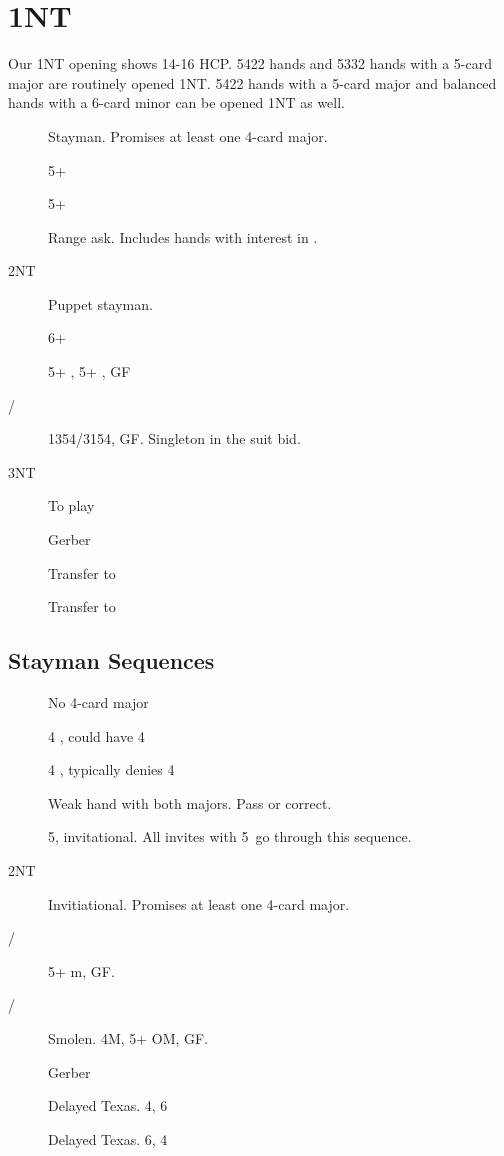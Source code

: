 \documentclass[tom-ari]{subfiles}
\begin{document}
\chapter{1NT}

Our 1NT opening shows 14-16 HCP. 5422 hands and 5332 hands with a 5-card major are routinely opened 1NT.
5422 hands with a 5-card major and balanced hands with a 6-card minor can be opened 1NT as well.

\begin{description}
  \item[] Stayman. Promises at least one 4-card major.
  \item[] 5+ \heartsuit
  \item[] 5+ \spadesuit
  \item[] Range ask. Includes hands with interest in \clubsuit.
  \item[2NT] Puppet stayman.
  \item[] 6+ \diamondsuit
  \item[] 5+ \diamondsuit, 5+ \clubsuit, GF
  \item[/] 1354/3154, GF. Singleton in the suit bid.
  \item[3NT] To play
  \item[] Gerber
  \item[] Transfer to \heartsuit
  \item[] Transfer to \spadesuit
\end{description}

\section{Stayman Sequences}

\begin{description}
  \item[] No 4-card major
  \item[] 4 \heartsuit, could have 4 \spadesuit
  \item[] 4 \spadesuit, typically denies 4 \heartsuit
\end{description}

\begin{description}
  \item[] Weak hand with both majors. Pass or correct.
  \item[] 5\spadesuit, invitational. All invites with 5\spadesuit ~go through this sequence. %
  \item[2NT] Invitiational. Promises at least one 4-card major.
  \item[/] 5+ m, GF.
  \item[/] Smolen. 4M, 5+ OM, GF.
  \item[] Gerber
  \item[] Delayed Texas. 4\spadesuit, 6\heartsuit
  \item[] Delayed Texas. 6\spadesuit, 4\heartsuit
\end{description}
\end{document}

